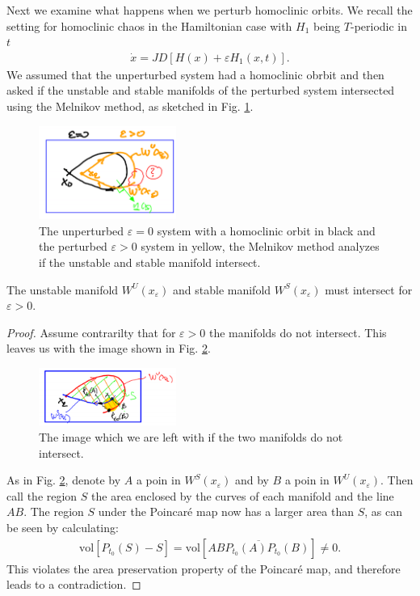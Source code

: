 Next we examine what happens when we perturb homoclinic orbits. We recall the setting for homoclinic chaos in the Hamiltonian case with $H_1$ being $T$-periodic in $t$
\begin{align}
	\dot{x} = JD[H(x) + \varepsilon H_{1}(x,t)].
\end{align}
We assumed that the unperturbed system had a homoclinic obrbit and then asked if the unstable and stable manifolds of the perturbed system intersected using the Melnikov method, as sketched in Fig. \ref{fig:ham_melnikov_method}.
\begin{figure}[h!]
	\centering
	\includegraphics[width=0.4\textwidth]{figures/ch8/8ham_melnikov_method.png}
	\caption{The unperturbed $\varepsilon=0$ system with a homoclinic orbit in black and the perturbed $\varepsilon>0$ system in yellow, the Melnikov method analyzes if the unstable and stable manifold intersect.}
	\label{fig:ham_melnikov_method}
\end{figure}

\begin{proposition}[]
	The unstable manifold $W^{U}(x_{\varepsilon})$ and stable manifold $W^{S}(x_{\varepsilon})$ must intersect for $\varepsilon>0$.
\end{proposition}
\begin{proof}
	Assume contrarilty that for $\varepsilon>0$ the manifolds do not intersect. This leaves us with the image shown in Fig. \ref{fig:contradiction_assumption}.
	\begin{figure}[h!]
		\centering
		\includegraphics[width=0.4\textwidth]{figures/ch8/9contradiction_assumption.png}
		\caption{The image which we are left with if the two manifolds do not intersect.}
		\label{fig:contradiction_assumption}
	\end{figure}

	As in Fig. \ref{fig:contradiction_assumption}, denote by $A$ a poin in $ W^{S}(x_\varepsilon)$ and by $B$ a poin in $W^{U}(x_{\varepsilon})$. Then call the region $S$ the area enclosed by the curves of each manifold and the line $AB$. The region $S$ under the  Poincaré map now has a larger area than $S$, as can be seen by calculating:
\begin{align}
	\textrm{vol}[P_{t_0}(S) - S] =  \textrm{vol} [\overline{ABP_{t_0}(A)P_{t_0}(B)}] \neq 0.
\end{align}
This violates the area preservation property of the Poincaré map, and therefore leads to a contradiction.
\end{proof}


